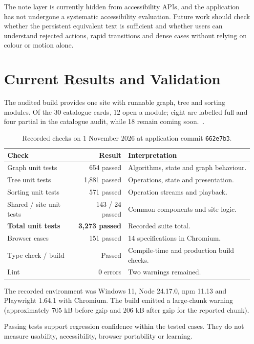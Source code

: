 \documentclass[11pt,a4paper]{article}
\newcommand{\code}[1]{\texttt{#1}}
\newcommand{\page}{\par\vspace{8pt}}
\begin{document}
The note layer is currently hidden from accessibility APIs, and the application has not undergone a systematic accessibility evaluation. Future work should check whether the persistent equivalent text is sufficient and whether users can understand rejected actions, rapid transitions and dense cases without relying on colour or motion alone.

\page
\section{Current Results and Validation}\label{sec:results}
The audited build provides one site with runnable graph, tree and sorting modules. Of the 30 catalogue cards, 12 open a module; eight are labelled full and four partial in the catalogue audit, while 18 remain coming soon.~\cite{validation}.



\begin{table}[tbp]\centering\small
\caption{Recorded checks on 1 November 2026 at application commit \code{662e7b3}.}\label{tab:tests}
\begin{tabularx}{\linewidth}{@{}XrX@{}}\toprule
Check & Result & Interpretation\\\midrule
Graph unit tests & 654 passed & Algorithms, state and graph behaviour.\\
Tree unit tests & 1,881 passed & Operations, state and presentation.\\
Sorting unit tests & 571 passed & Operation streams and playback.\\
Shared / site unit tests & 143 / 24 passed & Common components and site logic.\\
\textbf{Total unit tests} & \textbf{3,273 passed} & Recorded suite total.\\
Browser cases & 151 passed & 14 specifications in Chromium.\\
Type check / build & Passed & Compile-time and production build checks.\\
Lint & 0 errors & Two warnings remained.\\\bottomrule
\end{tabularx}
\end{table}

The recorded environment was Windows 11, Node 24.17.0, npm 11.13 and Playwright 1.64.1 with Chromium. The build emitted a large-chunk warning (approximately 705 kB before gzip and 206 kB after gzip for the reported chunk).

Passing tests support regression confidence within the tested cases. They do not measure usability, accessibility, browser portability or learning.
\end{document}
